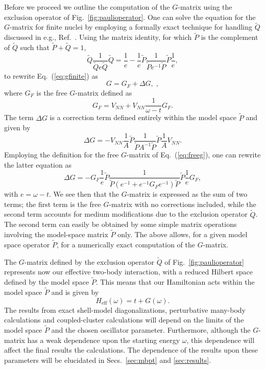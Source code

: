 \documentclass[aps,prc,twocolumn,floatfix]{revtex4}
\begin{document}
Before we proceed we outline the computation of the $G$-matrix using the 
exclusion operator of Fig.~\ref{fig:paulioperator}.
One can solve the equation for the $G$-matrix
for finite nuclei by employing
a formally
exact technique for handling $\tilde{Q}$
discussed in e.g., Ref.~\cite{hko95}.
Using the matrix identity, for which $\tilde{P}$ is the complement of 
$\tilde{Q}$ such that $\tilde{P}+\tilde{Q}=1$,
\begin{equation}
  \tilde{Q}\frac{1}{\tilde{Q}e\tilde{Q}}
  \tilde{Q}=\frac{1}{e}-
   \frac{1}{e}\tilde{P}\frac{1}{\tilde{P}e^{-1}\tilde{P}}\tilde{P}\frac{1}{e},
   \label{eq:matrix_relation_q}
\end{equation}
to rewrite Eq.~(\ref{eq:gfinite}) 
as
\begin{equation}
   G = G_{F} +\Delta G,\label{eq:gmod}\;,
\end{equation}
where $G_{F}$ is the free $G$-matrix defined as
\begin{equation}
   G_{F}=V_{NN}+V_{NN}\frac{1}{\omega - t}G_{F}. \label{eq:freeg}
\end{equation}
The term $\Delta G$ is a correction term defined entirely within the
model space $\tilde{P}$ and given by
\begin{equation}
   \Delta G =-V_{NN}\frac{1}{A}\tilde{P}
   \frac{1}{\tilde{P}A^{-1}\tilde{P}}\tilde{P}\frac{1}{A}V_{NN}.
\end{equation}
Employing the definition for the free $G$-matrix of Eq.\ (\ref{eq:freeg}),
one can rewrite the latter equation as
\begin{equation}
  \Delta G =-G_{F}\frac{1}{e}\tilde{P}
  \frac{1}{\tilde{P}(e^{-1}+e^{-1}G_{F}e^{-1})
  \tilde{P}}\tilde{P}\frac{1}{e}G_F,
\end{equation}
with $e=\omega -t$.
We see then that the $G$-matrix 
is expressed as the sum of two
terms; the first term is the free $G$-matrix with no  corrections
included, while the second term accounts for medium modifications
due to the exclusion operator $\tilde{Q}$. The second term can easily
be obtained by some simple matrix operations involving
the model-space matrix $\tilde{P}$ only. The above allows, for a given 
model space operator
$\tilde{P}$, for a numerically  exact computation of the $G$-matrix. 

The $G$-matrix defined by the exclusion operator $\tilde{Q}$
of Fig.~\ref{fig:paulioperator} represents now our effective two-body
interaction, with a reduced Hilbert space defined by the model space
$\tilde{P}$.  This means that our Hamiltonian acts within the model 
space $\tilde{P}$ and is given by 
\begin{equation}
H_{\mathrm{eff}}(\omega) = t+ G(\omega).
\label{eq:finalheff}
\end{equation}
The results from exact shell-model diagonalizations, perturbative
many-body calculations and coupled-cluster calculations will depend
on the limits  of the model space $\tilde{P}$ 
and the chosen oscillator parameter.  Furthermore, although the $G$-matrix has a 
weak dependence upon the starting energy $\omega$, this dependence will affect
the final results the calculations. 
The dependence of the results
upon these  parameters will be elucidated in Secs.~\ref{sec:mbpt} and 
\ref{sec:results}. 
\end{document}
